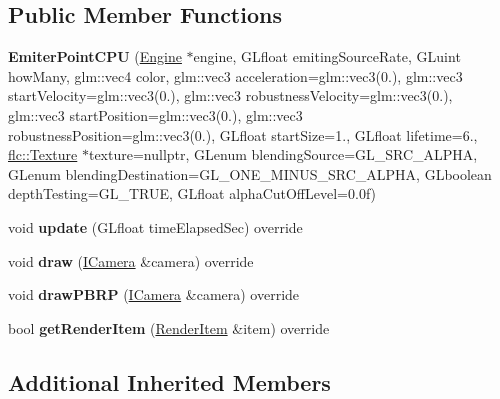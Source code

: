 \subsection*{Public Member Functions}
\begin{DoxyCompactItemize}
\item 
\mbox{\label{classflw_1_1flf_1_1EmiterPointCPU_a85fabd562bea67577072b4490ee07579}} 
{\bfseries Emiter\+Point\+C\+PU} (\hyperlink{classflw_1_1Engine}{Engine} $\ast$engine, G\+Lfloat emiting\+Source\+Rate, G\+Luint how\+Many, glm\+::vec4 color, glm\+::vec3 acceleration=glm\+::vec3(0.), glm\+::vec3 start\+Velocity=glm\+::vec3(0.), glm\+::vec3 robustness\+Velocity=glm\+::vec3(0.), glm\+::vec3 start\+Position=glm\+::vec3(0.), glm\+::vec3 robustness\+Position=glm\+::vec3(0.), G\+Lfloat start\+Size=1., G\+Lfloat lifetime=6., \hyperlink{classflw_1_1flc_1_1Texture}{flc\+::\+Texture} $\ast$texture=nullptr, G\+Lenum blending\+Source=G\+L\+\_\+\+S\+R\+C\+\_\+\+A\+L\+P\+HA, G\+Lenum blending\+Destination=G\+L\+\_\+\+O\+N\+E\+\_\+\+M\+I\+N\+U\+S\+\_\+\+S\+R\+C\+\_\+\+A\+L\+P\+HA, G\+Lboolean depth\+Testing=G\+L\+\_\+\+T\+R\+UE, G\+Lfloat alpha\+Cut\+Off\+Level=0.\+0f)
\item 
\mbox{\label{classflw_1_1flf_1_1EmiterPointCPU_a39dc08138d5366e98360db1e40e5f3df}} 
void {\bfseries update} (G\+Lfloat time\+Elapsed\+Sec) override
\item 
\mbox{\label{classflw_1_1flf_1_1EmiterPointCPU_ad17e8a7d32a32e795be9d071acca15f6}} 
void {\bfseries draw} (\hyperlink{classflw_1_1flf_1_1ICamera}{I\+Camera} \&camera) override
\item 
\mbox{\label{classflw_1_1flf_1_1EmiterPointCPU_ac910a2c531211f991146a7ee566b3c6e}} 
void {\bfseries draw\+P\+B\+RP} (\hyperlink{classflw_1_1flf_1_1ICamera}{I\+Camera} \&camera) override
\item 
\mbox{\label{classflw_1_1flf_1_1EmiterPointCPU_a52c18a5d5a4d36cfb2b07f6f1355be80}} 
bool {\bfseries get\+Render\+Item} (\hyperlink{structflw_1_1flf_1_1RenderItem}{Render\+Item} \&item) override
\end{DoxyCompactItemize}
\subsection*{Additional Inherited Members}


